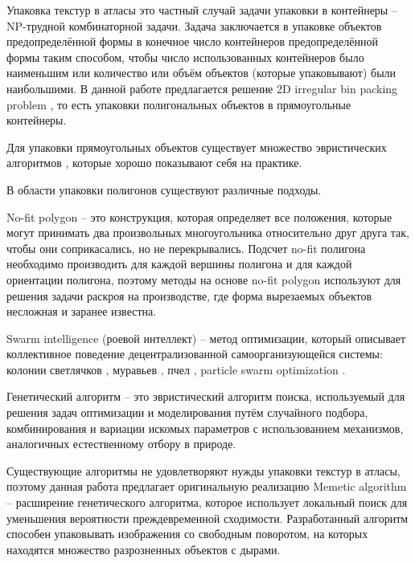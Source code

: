 \documentclass{fefu_thesis/cls/fefu}
\begin{document}
    Упаковка текстур в атласы это частный случай задачи упаковки в контейнеры -- NP-трудной \cite{BinPackingIsNPHard} комбинаторной задачи. Задача заключается в упаковке объектов предопределённой формы в конечное число контейнеров предопределённой формы таким способом, чтобы число использованных контейнеров было наименьшим или количество или объём объектов (которые упаковывают) были наибольшими. В данной работе предлагается решение 2D irregular bin packing problem \cite{TypologyOfPackingProblems}, то есть упаковки полигональных объектов в прямоугольные контейнеры.

    Для упаковки прямоугольных объектов существует множество эвристических алгоритмов \cite{ThousandWayToPackBin}, которые хорошо показывают себя на практике.

    В области упаковки полигонов существуют различные подходы.

    No-fit polygon \cite{NofitPolygon}\cite{NofitPolygon2} -- это конструкция, которая определяет все положения, которые могут принимать два произвольных многоугольника относительно друг друга так, чтобы они соприкасались, но не перекрывались. Подсчет no-fit полигона необходимо производить для каждой вершины полигона и для каждой ориентации полигона, поэтому методы на основе no-fit polygon используют для решения задачи раскроя на производстве, где форма вырезаемых объектов несложная и заранее известна.

    Swarm intelligence (роевой интеллект) -- метод оптимизации, который описывает коллективное поведение децентрализованной самоорганизующейся системы: колонии светлячков \cite{FireFly}, муравьев \cite{AntColony}, пчел \cite{PlayrixArticle}, particle swarm optimization \cite{PSO}.

    Генетический алгоритм \cite{JAKOBS1996165} -- это эвристический алгоритм поиска, используемый для решения задач оптимизации и моделирования путём случайного подбора, комбинирования и вариации искомых параметров с использованием механизмов, аналогичных естественному отбору в природе.

   Существующие алгоритмы не удовлетворяют нужды упаковки текстур в атласы, поэтому данная работа предлагает оригинальную реализацию Memetic algorithm \cite{WhatIsMemetic} -- расширение генетического алгоритма, которое использует локальный поиск для уменьшения вероятности преждевременной сходимости. Разработанный алгоритм способен упаковывать изображения со свободным поворотом, на которых находятся множество разрозненных объектов с дырами.
\end{document}

